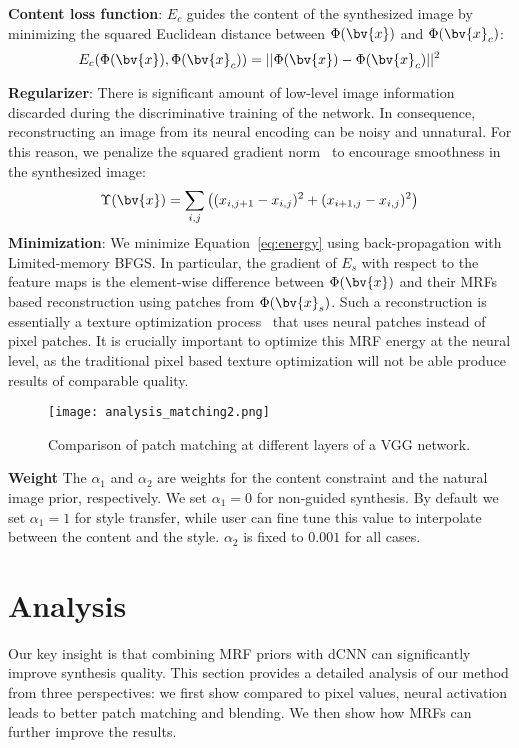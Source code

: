 \documentclass[10pt,twocolumn,letterpaper]{article}
\begin{document}
\textbf{Content loss function}: $E_{c}$ guides the content of the synthesized image by minimizing the squared Euclidean distance between $\Phi(\bv{x})$ and $\Phi(\bv{x}_{c})$:
\begin{equation}
E_{c}(\Phi(\bv{x}), \Phi(\bv{x}_{c})) = ||\Phi(\bv{x}) - \Phi(\bv{x}_{c})||^{2}
\label{eq:content}
\end{equation}

\textbf{Regularizer}: There is significant amount of low-level image information discarded during the discriminative training of the network. In consequence, reconstructing an image from its neural encoding can be noisy and unnatural. For this reason, we penalize the squared gradient norm~\cite{Mahendran15} to encourage smoothness in the synthesized image:
%
\begin{equation}
\Upsilon(\bv{x}) = \sum_{i, j}\left((x_{i, j + 1} - x_{i, j})^{2} + (x_{i + 1, j} - x_{i, j})^{2}\right)
\label{eq:tv}
\end{equation}
%
\textbf{Minimization}: We minimize Equation~\ref{eq:energy} using back-propagation with Limited-memory BFGS. In particular, the gradient of $E_{s}$ with respect to the feature maps is the element-wise difference between $\Phi(\bv{x})$ and their MRFs based reconstruction using patches from $\Phi(\bv{x}_{s})$. Such a reconstruction is essentially a texture optimization process~\cite{Kwatra05} that uses neural patches instead of pixel patches. It is crucially important to optimize this MRF energy at the neural level, as the traditional pixel based texture optimization will not be able produce results of comparable quality.

\begin{figure}[t]
	\centering
	\texttt{[image: analysis\_matching2.png]}
	\caption{Comparison of patch matching at different layers of a VGG network.}\label{fig:analysis_matching}
\end{figure}

\textbf{Weight} The $\alpha_{1}$ and $\alpha_{2}$ are weights for the content constraint and the natural image prior, respectively. We set $\alpha_{1} = 0$ for non-guided synthesis. By default we set $\alpha_{1} = 1$ for style transfer, while user can fine tune this value to interpolate between the content and the style. $\alpha_{2}$ is fixed to $0.001$ for all cases.

\section{Analysis}
Our key insight is that combining MRF priors with dCNN can significantly improve synthesis quality. This section provides a detailed analysis of our method from three perspectives: we first show compared to pixel values, neural activation leads to better patch matching and blending. We then show how MRFs can further improve the results.
\end{document}
